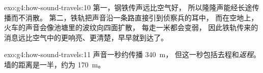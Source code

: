 \begin{solution}{exo:g4:how-sound-travels:10}
第一，钢铁传声远比空气好，
所以隆隆声能经长途传播而不消散。
第二，铁轨把声音沿一条路直接引到侦察兵的耳中，
而在空地上，火车的声音会像池塘里的波纹向四面扩散，
每走一米都会变弱，
因此铁轨传来的消息远比空气中的更响亮、更清楚，早早就到达了。
\end{solution}

\begin{solution}{exo:g4:how-sound-travels:11}
声音一秒约传播 \qty{340}{m}，
但这一秒包括去程和\emph{返程}。
墙的距离是一半，约为 \qty{170}{m}。
\end{solution}
